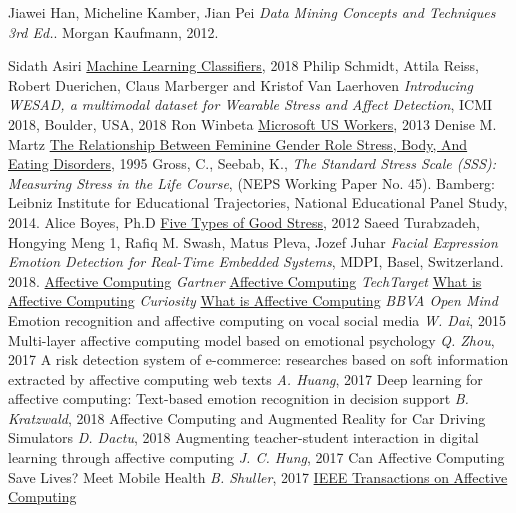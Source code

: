 \newpage

\begin{thebibliography}{9}
	Jiawei Han, Micheline Kamber, Jian Pei
	\textit{Data Mining Concepts and Techniques 3rd Ed.}. 
	Morgan Kaufmann, 2012.

	Sidath Asiri
	\href{https://towardsdatascience.com/machine-learning-classifiers-a5cc4e1b0623}{Machine Learning Classifiers},
	2018
	Philip Schmidt, Attila Reiss, Robert Duerichen, Claus Marberger and Kristof Van Laerhoven
	\textit{Introducing WESAD, a multimodal dataset for Wearable Stress and Affect Detection}, 
	ICMI 2018, Boulder, USA, 2018
	Ron Winbeta
	\href{https://www.onmsft.com/news/microsoft-us-workers-spend-7-hours-computer-day-average}{Microsoft US Workers},
	2013
	Denise M. Martz
	\href{https://onlinelibrary.wiley.com/doi/abs/10.1111/j.1471-6402.1995.tb00088.x}{The Relationship Between Feminine Gender Role Stress, Body, And Eating Disorders},
	1995
	Gross, C., Seebab, K.,
	\textit{The Standard Stress Scale (SSS): Measuring Stress in the Life Course},
	(NEPS Working Paper No. 45). Bamberg: Leibniz Institute for Educational Trajectories,
National Educational Panel Study, 2014.
	Alice Boyes, Ph.D 
	\href{https://www.psychologytoday.com/us/blog/in-practice/201206/five-types-good-stress}{Five Types of Good Stress}, 2012
	Saeed Turabzadeh, Hongying Meng 1, Rafiq M. Swash, Matus Pleva, Jozef Juhar
	\textit{Facial Expression Emotion Detection for Real-Time Embedded Systems}, 
	MDPI, Basel, Switzerland. 2018.
	\href{http://www.gartner.com/it-glossary/affective-computing}{Affective Computing}
	\textit{Gartner}
	\href{http://whatis.techtarget.com/definition/affective-computing}{Affective Computing}
	\textit{TechTarget}
	\href{http://curiosity.discovery.com/question/what-is-affective-computing}{What is Affective Computing}
	\textit{Curiosity}
	\href{https://www.bbvaopenmind.com/en/what-is-affective-computing/}{What is Affective Computing}
	\textit{BBVA Open Mind}
	Emotion recognition and affective computing on vocal social media
	\textit{W. Dai}, 2015
	Multi-layer affective computing model based on emotional psychology
	\textit{Q. Zhou}, 2017
	A risk detection system of e-commerce: researches based on soft information extracted by affective computing web texts
	\textit{A. Huang}, 2017
	Deep learning for affective computing: Text-based emotion recognition in decision support
	\textit{B. Kratzwald}, 2018
	Affective Computing and Augmented Reality for Car Driving Simulators
	\textit{D. Dactu}, 2018
	Augmenting teacher-student interaction in digital learning through affective computing
	\textit{J. C. Hung}, 2017
	Can Affective Computing Save Lives? Meet Mobile Health
	\textit{B. Shuller}, 2017
	\href{https://ieeexplore-ieee-org.ezproxy.lib.uh.edu/xpl/RecentIssue.jsp?punumber=5165369}{IEEE Transactions on Affective Computing}

\end{thebibliography}
